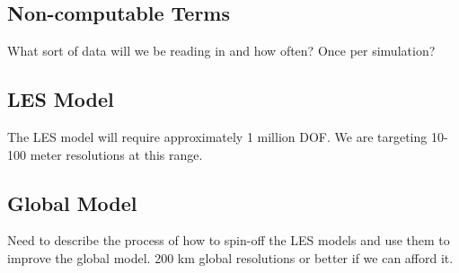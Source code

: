 \documentclass[12pt]{article}
\begin{document}
\subsection{Non-computable Terms}
What sort of data will we be reading in and how often? Once per simulation?  

\subsection{LES Model}
The LES model will require approximately 1 million DOF.  We are targeting 10-100 meter resolutions at this range.

\subsection{Global Model}
Need to describe the process of how to spin-off the LES models and use them to improve the global model. 200 km global resolutions or better if we can afford it. 




\end{document}

